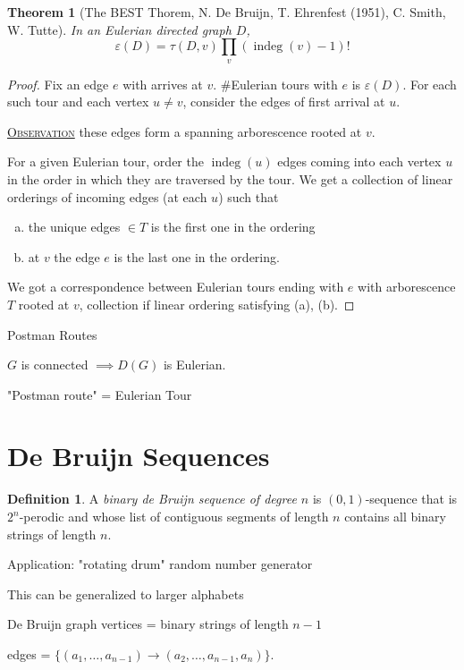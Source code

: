 \documentclass{report}
\newcommand{\fancyem}[1]{\underline{\textsc{#1}}}
\newtheorem{theorem}{Theorem}[section]
\theoremstyle{definition}
\newtheorem{definition}{Definition}[section]
\theoremstyle{remark}
\numberwithin{equation}{section}
\begin{document}
\begin{theorem}[The BEST Thorem, N. De Bruijn, T. Ehrenfest (1951), C. Smith, W. Tutte]
    In an Eulerian directed graph $D$,
    \[
    \varepsilon(D) = \tau(D, v)\prod_v (\operatorname{indeg}(v) - 1)!    
    \]
\end{theorem}
\begin{proof}
    Fix an edge $e$ with arrives at $v$. $\#$Eulerian tours with $e$ is $\varepsilon(D)$. For each such tour and each vertex $u \neq v$, consider the edges of first arrival at $u$.

    \fancyem{Observation} these edges form a spanning arborescence rooted at $v$.

    For a given Eulerian tour, order the $\operatorname{indeg}(u)$ edges coming into each vertex $u$ in the order in which they are traversed by the tour. We get a collection of linear orderings of incoming edges (at each $u$) such that 
    \begin{enumerate}[(a)]
        \item the unique edges $\in T$ is the first one in the ordering
        \item at $v$ the edge $e$ is the last one in the ordering.
    \end{enumerate}
    We got a correspondence between Eulerian tours ending with $e$ with arborescence $T$ rooted at $v$, collection if linear ordering satisfying (a), (b).
\end{proof}

Postman Routes

$G$ is connected $\implies D(G)$ is Eulerian.

"Postman route" = Eulerian Tour

\section{De Bruijn Sequences}
\begin{definition}
    A \emph{binary de Bruijn sequence of degree $n$} is $(0, 1)$-sequence that is $2^n$-perodic and whose list of contiguous segments of length $n$ contains all binary strings of length $n$.
\end{definition}

Application: "rotating drum" random number generator


This can be generalized to larger alphabets

De Bruijn graph
vertices = binary strings of length $n - 1$

edges = $\{(a_1,\ldots, a_{n-1}) \to (a_2, \ldots, a_{n-1}, a_n)\}$.
\end{document}
